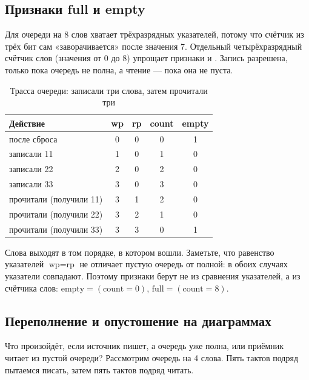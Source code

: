 \subsection{Признаки full и empty}

Для очереди на 8 слов хватает трёхразрядных указателей, потому что
счётчик из трёх бит сам «заворачивается» после значения 7. Отдельный
четырёхразрядный счётчик слов  (значения от 0 до 8) упрощает
признаки  и . Запись разрешена, только пока очередь не
полна, а чтение --- пока она не пуста.

\begin{table}[H]
\centering
\caption{Трасса очереди: записали три слова, затем прочитали три}
\small
\begin{tabular}{lcccc}
\toprule
\textbf{Действие} & \textbf{wp} & \textbf{rp} & \textbf{count} & \textbf{empty} \\
\midrule
после сброса & 0 & 0 & 0 & 1 \\
записали 11 & 1 & 0 & 1 & 0 \\
записали 22 & 2 & 0 & 2 & 0 \\
записали 33 & 3 & 0 & 3 & 0 \\
прочитали (получили 11) & 3 & 1 & 2 & 0 \\
прочитали (получили 22) & 3 & 2 & 1 & 0 \\
прочитали (получили 33) & 3 & 3 & 0 & 1 \\
\bottomrule
\end{tabular}
\end{table}

Слова выходят в том порядке, в котором вошли. Заметьте, что равенство
указателей $\text{wp}=\text{rp}$ не отличает пустую очередь от полной: в обоих
случаях указатели совпадают. Поэтому признаки берут не из сравнения
указателей, а из счётчика слов: $\text{empty}=(\text{count}=0)$,
$\text{full}=(\text{count}=8)$.

\subsection{Переполнение и опустошение на диаграммах}

Что произойдёт, если источник пишет, а очередь уже полна, или приёмник читает
из пустой очереди? Рассмотрим очередь на 4 слова. Пять тактов подряд
пытаемся писать, затем пять тактов подряд читать.


